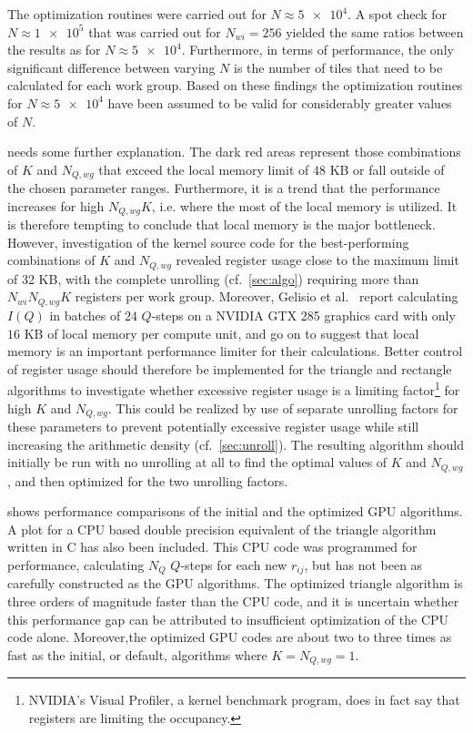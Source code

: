 \documentclass[11pt,twoside]{report}
\begin{document}
\indent The optimization routines were carried out for $N \approx \num{5e4}$. A spot check for $N \approx \num{1e5}$ that was carried out for $N_{wi} = 256$ yielded the same ratios between the results as for $N \approx \num{5e4}$. Furthermore, in terms of performance, the only significant difference between varying $N$ is the number of tiles that need to be calculated for each work group. Based on these findings the optimization routines for $N \approx \num{5e4}$ have been assumed to be valid for considerably greater values of $N$.

\indent {} needs some further explanation. The dark red areas represent those combinations of $K$ and $N_{Q,wg}$ that exceed the local memory limit of $48$ KB or fall outside of the chosen parameter ranges. Furthermore, it is a trend that the performance increases for high $N_{Q,wg}K$, i.e. where the most of the local memory is utilized. It is therefore tempting to conclude that local memory is the major bottleneck. However, investigation of the kernel source code for the best-performing combinations of $K$ and $N_{Q,wg}$ revealed register usage close to the maximum limit of 32 KB, with the complete unrolling (cf.~\cref{sec:algo}) requiring more than $N_{wi}N_{Q,wg}K$ registers per work group. Moreover, Gelisio et al.~\cite{ISI:000277392600034} report calculating $I(Q)$ in batches of $24$ $Q$-steps on a NVIDIA GTX 285 graphics card with only $16$ KB of local memory per compute unit, and go on to suggest that local memory is an important performance limiter for their calculations. Better control of register usage should therefore be implemented for the triangle and rectangle algorithms to investigate whether excessive register usage is a limiting factor\footnote{NVIDIA's Visual Profiler, a kernel benchmark program, does in fact say that registers are limiting the occupancy.} for high $K$ and $N_{Q,wg}$. This could be realized by use of separate unrolling factors for these parameters to prevent potentially excessive register usage  while still increasing the arithmetic density  (cf.~\cref{sec:unroll}). The resulting algorithm should initially be run with no unrolling at all to find the optimal values of $K$ and $N_{Q,wg}$, and then optimized for the two  unrolling factors. 

\indent {} shows performance comparisons of the initial and the optimized GPU algorithms. A plot for a CPU based double precision equivalent of the triangle algorithm written in C has also been included. This CPU code was programmed for performance, calculating $N_{Q}$ $Q$-steps for each new $r_{ij}$, but has not been as carefully constructed as the GPU algorithms. The optimized triangle algorithm is three orders of magnitude faster than the CPU code, and it is uncertain whether this  performance gap can be attributed to insufficient optimization of the CPU code alone. Moreover,the optimized GPU codes are about two to three times as fast as the initial, or default, algorithms where $K = N_{Q,wg} = 1$. 
\end{document}

